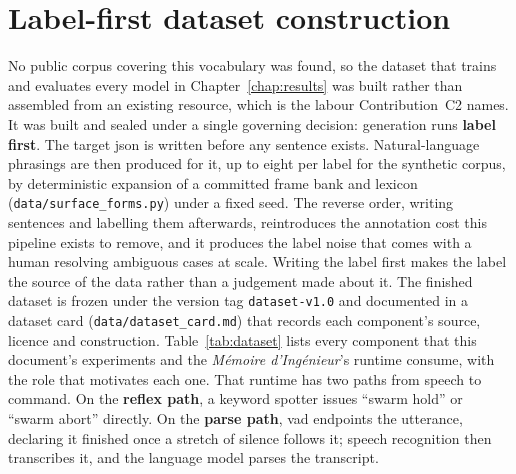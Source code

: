 \section{Label-first dataset construction}
\label{sec:dataset}
No public corpus covering this vocabulary was found, so the dataset that trains and evaluates every
model in Chapter~\ref{chap:results} was built rather than assembled from an existing resource, which
is the labour Contribution~C2 names. It was built and sealed under a single governing decision:
generation runs \textbf{label first}. The target \gls{json} is written before any sentence exists.
Natural-language phrasings are then produced for it, up to eight per label for the synthetic corpus,
by deterministic expansion of a committed frame bank and lexicon (\texttt{data/surface\_forms.py})
under a fixed seed. The reverse order, writing sentences and
labelling them afterwards, reintroduces the annotation cost this pipeline exists to remove, and it
produces the label noise that comes with a human resolving ambiguous cases at scale. Writing the
label first makes the label the source of the data rather than a judgement made about it. The
finished dataset is frozen under the version tag \texttt{dataset-v1.0} and documented in a dataset
card (\texttt{data/dataset\_card.md}) that records each component's source, licence and
construction. Table~\ref{tab:dataset} lists every component that this document's experiments and
the \emph{M\'emoire d'Ing\'enieur}'s runtime consume, with the role that motivates each one. That
runtime has two paths from speech to command. On the \textbf{reflex path}, a keyword spotter issues
``swarm hold'' or ``swarm abort'' directly. On the \textbf{parse path}, \gls{vad} endpoints the
utterance, declaring it finished once a stretch of silence follows it; speech recognition then
transcribes it, and the language model parses the transcript.

